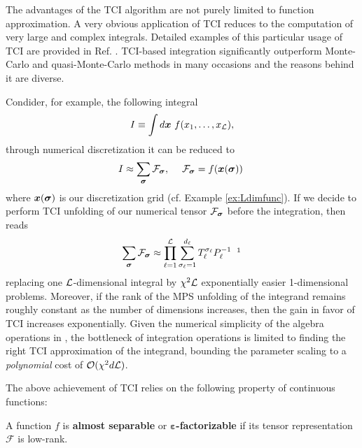 The advantages of the TCI algorithm are not purely limited to function approximation. A very obvious application of TCI reduces to the computation of very large and complex integrals. Detailed examples of this particular usage of TCI are provided in Ref. \cite{Fernandez2022, Fernandez2024, Dolgov2020}. TCI-based integration significantly outperform Monte-Carlo and quasi-Monte-Carlo methods in many occasions and the reasons behind it are diverse. 

Condider, for example, the following integral
\begin{equation}
	I \equiv \int d\boldsymbol{x} \ f(x_1,\dots,x_\mL),
	\label{eq:LdimIntegral}
\end{equation}
through numerical discretization it can be reduced to 
\begin{equation}
	I \approx \sum_{\boldsymbol{\sigma}} \mathcal{F}_{\boldsymbol{\sigma}}  ,\quad \; \mathcal{F}_{\boldsymbol{\sigma}} = f(\boldsymbol{x}(\boldsymbol{\sigma}))\;
	\label{eq:LdimapproxIntegral}
\end{equation}
where $\boldsymbol{x}(\boldsymbol{\sigma})$ is our discretization grid (cf. Example \ref{ex:Ldimfunc}). If we decide to perform TCI unfolding of our numerical tensor $\mathcal{F}_{\boldsymbol{\sigma}}$ before the integration,  then reads
\begin{equation}
	\sum_{\bsigma} \mathcal{F}_{\bsigma} \approx \prod_{\ell=1}^\mL \sum^{d_\ell}_{\sigma_\ell = 1} T^{\sigma_\ell}_\ell P^{-1}_\ell \; \;\footnotemark
	\label{eq:LdimTCIIntegral}
\end{equation}
replacing one $\mathcal{L}$-dimensional integral by $\chi^2\mathcal{L}$ exponentially easier 1-dimensional problems. Moreover, if the rank of the MPS unfolding of the integrand remains roughly constant as the number of dimensions increases, then the gain in favor of TCI increases exponentially. Given the numerical simplicity of the algebra operations in , the bottleneck of integration operations is limited to finding the right TCI approximation of the integrand, bounding the parameter scaling to a \textit{polynomial} cost of $\mathcal{O} (\chi^2d\mathcal{L})$. 


The above achievement of TCI relies on the following property of continuous functions:
\begin{definition}
	A function $f$ is {\normalfont \textbf{almost separable}} \cite{Fernandez2024} or {\normalfont \textbf{$\boldsymbol{\varepsilon}$-factorizable}} \cite{Fernandez2022} if its tensor representation $\mathcal{F}$ is low-rank.
	\label{def:separfunc}
\end{definition}

